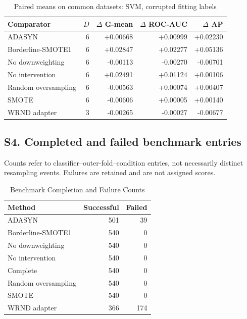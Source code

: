 \begin{table}[htbp]
\caption{Paired means on common datasets: SVM, corrupted fitting labels}
\centering\small
\begin{tabular}{lrrrr}
\hline
Comparator & $D$ & $\Delta$ G-mean & $\Delta$ ROC-AUC & $\Delta$ AP\\
\hline
ADASYN & 6 & +0.00668 & +0.00999 & +0.02230 \\
Borderline-SMOTE1 & 6 & +0.02847 & +0.02277 & +0.05136 \\
No downweighting & 6 & -0.00113 & -0.00270 & -0.00701 \\
No intervention & 6 & +0.02491 & +0.01124 & +0.00106 \\
Random oversampling & 6 & -0.00563 & +0.00074 & +0.00407 \\
SMOTE & 6 & -0.00606 & +0.00005 & +0.00140 \\
WRND adapter & 3 & -0.00265 & -0.00027 & -0.00677 \\
\hline
\end{tabular}
\end{table}
\clearpage
\subsection*{S4. Completed and failed benchmark entries}
Counts refer to classifier--outer-fold--condition entries, not necessarily distinct resampling events. Failures are retained and are not assigned scores.
\begin{table}[htbp]
\caption{Benchmark Completion and Failure Counts}
\centering\begin{tabular}{lrr}
\hline
Method & Successful & Failed\\
\hline
ADASYN & 501 & 39 \\
Borderline-SMOTE1 & 540 & 0 \\
No downweighting & 540 & 0 \\
No intervention & 540 & 0 \\
Complete & 540 & 0 \\
Random oversampling & 540 & 0 \\
SMOTE & 540 & 0 \\
WRND adapter & 366 & 174 \\
\hline
\end{tabular}\end{table}

\clearpage

